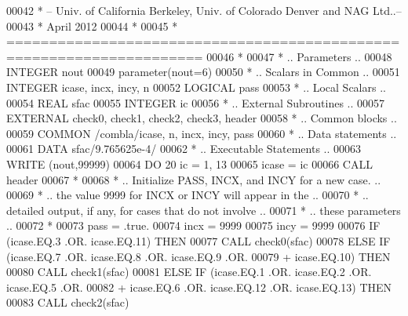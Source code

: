 \begin{DoxyCode}
00042 \textcolor{comment}{*  -- Univ. of California Berkeley, Univ. of Colorado Denver and NAG Ltd..--}
00043 \textcolor{comment}{*     April 2012}
00044 \textcolor{comment}{*}
00045 \textcolor{comment}{*  =====================================================================}
00046 \textcolor{comment}{*}
00047 \textcolor{comment}{*     .. Parameters ..}
00048       \textcolor{keywordtype}{INTEGER}          nout
00049       parameter(nout=6)
00050 \textcolor{comment}{*     .. Scalars in Common ..}
00051       \textcolor{keywordtype}{INTEGER}          icase, incx, incy, n
00052       \textcolor{keywordtype}{LOGICAL}          pass
00053 \textcolor{comment}{*     .. Local Scalars ..}
00054       \textcolor{keywordtype}{REAL}             sfac
00055       \textcolor{keywordtype}{INTEGER}          ic
00056 \textcolor{comment}{*     .. External Subroutines ..}
00057       \textcolor{keywordtype}{EXTERNAL}         check0, check1, check2, check3, header
00058 \textcolor{comment}{*     .. Common blocks ..}
00059       \textcolor{keyword}{COMMON}           /combla/icase, n, incx, incy, pass
00060 \textcolor{comment}{*     .. Data statements ..}
00061       \textcolor{keyword}{DATA}             sfac/9.765625e-4/
00062 \textcolor{comment}{*     .. Executable Statements ..}
00063       \textcolor{keyword}{WRITE} (nout,99999)
00064       \textcolor{keywordflow}{DO} 20 ic = 1, 13
00065          icase = ic
00066          \textcolor{keyword}{CALL }header
00067 \textcolor{comment}{*}
00068 \textcolor{comment}{*        .. Initialize  PASS,  INCX,  and INCY for a new case. ..}
00069 \textcolor{comment}{*        .. the value 9999 for INCX or INCY will appear in the ..}
00070 \textcolor{comment}{*        .. detailed  output, if any, for cases  that do not involve ..}
00071 \textcolor{comment}{*        .. these parameters ..}
00072 \textcolor{comment}{*}
00073          pass = .true.
00074          incx = 9999
00075          incy = 9999
00076          \textcolor{keywordflow}{IF} (icase.EQ.3 .OR. icase.EQ.11) \textcolor{keywordflow}{THEN}
00077             \textcolor{keyword}{CALL }check0(sfac)
00078          \textcolor{keywordflow}{ELSE} \textcolor{keywordflow}{IF} (icase.EQ.7 .OR. icase.EQ.8 .OR. icase.EQ.9 .OR.
00079      +            icase.EQ.10) \textcolor{keywordflow}{THEN}
00080             \textcolor{keyword}{CALL }check1(sfac)
00081          \textcolor{keywordflow}{ELSE} \textcolor{keywordflow}{IF} (icase.EQ.1 .OR. icase.EQ.2 .OR. icase.EQ.5 .OR.
00082      +            icase.EQ.6 .OR. icase.EQ.12 .OR. icase.EQ.13) \textcolor{keywordflow}{THEN}
00083             \textcolor{keyword}{CALL }check2(sfac)

\end{DoxyCode}
